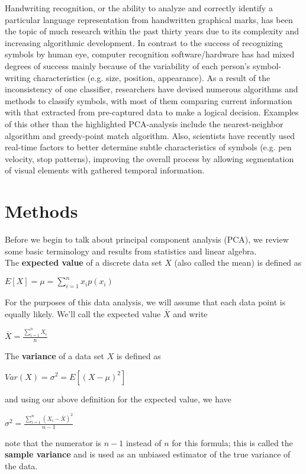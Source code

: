 \documentclass[twocolumn]{article}
\begin{document}
Handwriting recognition, or the ability to analyze and correctly identify a particular language representation from handwritten graphical marks, has been the topic of much research within the past thirty years due to its complexity and increasing algorithmic development. In contrast to the success of recognizing symbols by human eye, computer recognition software/hardware has had mixed degrees of success mainly because of the variability of each person's symbol-writing characteristics (e.g. size, position, appearance). As a result of the inconsistency of one classifier, researchers have devised numerous algorithms and methods to classify symbols, with most of them comparing current information with that extracted from pre-captured data to make a logical decision. Examples of this other than the highlighted PCA-analysis include the nearest-neighbor algorithm and greedy-point match algorithm. Also, scientists have recently used real-time factors to better determine subtle characteristics of symbols (e.g. pen velocity, stop patterns), improving the overall process by allowing segmentation of visual elements with gathered temporal information. 
\section{Methods} %
\label{sec:methods}
Before we begin to talk about principal component analysis (PCA), we review some basic terminology and results from statistics and linear algebra.\\
The \textbf{expected value} of a discrete data set $X$ (also called the mean) is defined as
\begin{center}
$\displaystyle E[X] = \mu =  \sum_{i=1}^{n}x_ip(x_i)$
\end{center}
For the purposes of this data analysis, we will assume that each data point is equally likely. We'll call the expected value 
$\overline{X}$ and write
\begin{center}
$\displaystyle \overline{X} = \frac{\sum_{i=1}^{n}X_i}{n}$
\end{center}
The \textbf{variance} of a data set $X$ is defined as
\begin{center}
$\displaystyle Var(X) = \sigma^2 = E\left[\left(X-\mu\right)^2\right]$
\end{center} 
and using our above definition for the expected value, we have
\begin{center}
$\displaystyle \sigma^2 = 
\frac{\sum_{i=1}^{n}(X_i - \overline{X})^2}{n-1}$
\end{center}
note that the numerator is $n-1$ instead of $n$ for this formula; this is called the \textbf{sample variance} and is used as an unbiased estimator of the true variance of the data.
\end{document}

